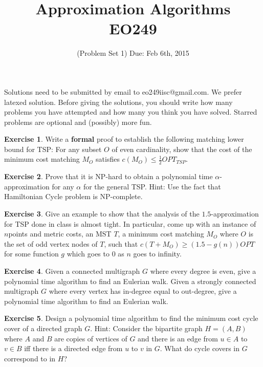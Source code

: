 \documentclass[11pt]{article}
\theoremstyle{definition}
\newtheorem{exercise}{Exercise}
\begin{document}
\title{{\bf Approximation Algorithms} \\ 
{\normalsize EO249}}
\date{(Problem Set 1) Due: Feb 6th, 2015}
\maketitle
{\small 
Solutions need to be submitted by email to eo249iisc@gmail.com. We prefer latexed solution. 
Before giving the solutions, you should write how many problems you have attempted and how many you think you have solved.
Starred problems are optional and (possibly) more fun.
}
\vspace{1ex}

\begin{exercise}
Write a {\bf formal} proof to establish the following matching lower bound for TSP:
For any subset $O$ of even cardinality, show that the cost of the minimum cost matching $M_O$ satisfies
$c(M_O) \leq \frac{1}{2}OPT_{TSP}$.
\end{exercise}
\vspace{1ex}

\begin{exercise}
Prove that it is NP-hard to obtain a polynomial time  $\alpha$-approximation for any $\alpha$ for the general TSP. Hint: Use the fact that Hamiltonian Cycle problem is NP-complete.
\end{exercise}
\vspace{1ex}


\begin{exercise}
Give an example to show that the analysis of the $1.5$-approximation for TSP done in class is almost tight.
In particular, come up with an instance of $n$points and metric costs, an MST $T$, a minimum cost matching $M_O$ where
$O$ is the set of odd vertex nodes of $T$, such that $c(T + M_O) \geq (1.5 - g(n)) OPT$ for some function $g$ which goes to $0$ as $n$ goes to infinity.
\end{exercise}
\vspace{1ex}

\begin{exercise}
Given a connected multigraph $G$ where every degree is even, give a polynomial time algorithm to find an Eulerian walk.
Given a strongly connected multigraph $G$ where every vertex has in-degree equal to out-degree, give a polynomial time algorithm to find an Eulerian walk.
\end{exercise}
\vspace{1ex}

\begin{exercise}
Design a polynomial time algorithm to find the minimum cost cycle cover of a directed graph $G$.
Hint: Consider the bipartite graph $H = (A,B)$ where $A$ and $B$ are copies of vertices of $G$ and there is an edge from $u\in A$ to $v\in B$
iff there is a directed edge from $u$ to $v$ in $G$. What do cycle covers in $G$ correspond to in $H$? 
\end{exercise}
\vspace{1ex}
\end{document}

